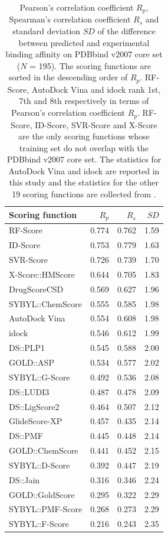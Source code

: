 \documentclass[journal=jacsat,manuscript=article]{achemso}
\begin{document}
\begin{table}
\caption{Pearson's correlation coefficient $R_p$, Spearman's correlation coefficient $R_s$ and standard deviation $SD$ of the difference between predicted and experimental binding affinity on PDBbind v2007 core set ($N$ = 195). The scoring functions are sorted in the descending order of $R_p$. RF-Score, AutoDock Vina and idock rank 1st, 7th and 8th respectively in terms of Pearson's correlation coefficient $R_p$. RF-Score, ID-Score, SVR-Score and X-Score are the only scoring functions whose training set do not overlap with the PDBbind v2007 core set. The statistics for AutoDock Vina and idock are reported in this study and the statistics for the other 19 scoring functions are collected from \cite{1313,564,1305,1295}.}
  \label{tbl:example}
  \begin{tabular}{lrrr}
    \hline
Scoring function & $R_p$ & $R_s$ & $SD$\\
\hline
RF-Score & 0.774 & 0.762 & 1.59\\
ID-Score & 0.753 & 0.779 & 1.63\\
SVR-Score & 0.726 & 0.739 & 1.70\\
X-Score::HMScore & 0.644 & 0.705 & 1.83\\
DrugScoreCSD & 0.569 & 0.627 & 1.96\\
SYBYL::ChemScore & 0.555 & 0.585 & 1.98\\
AutoDock Vina & 0.554 & 0.608 & 1.98\\
idock & 0.546 & 0.612 & 1.99\\
DS::PLP1 & 0.545 & 0.588 & 2.00\\
GOLD::ASP & 0.534 & 0.577 & 2.02\\
SYBYL::G-Score & 0.492 & 0.536 & 2.08\\
DS::LUDI3 & 0.487 & 0.478 & 2.09\\
DS::LigScore2 & 0.464 & 0.507 & 2.12\\
GlideScore-XP & 0.457 & 0.435 & 2.14\\
DS::PMF & 0.445 & 0.448 & 2.14\\
GOLD::ChemScore & 0.441 & 0.452 & 2.15\\
SYBYL::D-Score & 0.392 & 0.447 & 2.19\\
DS::Jain & 0.316 & 0.346 & 2.24\\
GOLD::GoldScore & 0.295 & 0.322 & 2.29\\
SYBYL::PMF-Score & 0.268 & 0.273 & 2.29\\
SYBYL::F-Score & 0.216 & 0.243 & 2.35\\
    \hline
  \end{tabular}
\end{table}
\end{document}
